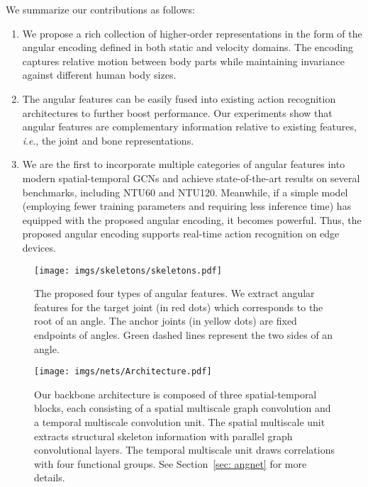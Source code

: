 \documentclass[journal,comsoc]{IEEEtran}
\newcommand{\ie}{\textit{i}.\textit{e}.,}
\begin{document}
We summarize our contributions as follows: 
\begin{enumerate}
    \item We propose a rich collection of higher-order representations in the form of the angular encoding defined in both static and velocity domains. The encoding captures relative motion between body parts while maintaining invariance against different human body sizes. 
    \item The angular features can be easily fused into existing action recognition architectures to further boost performance. Our experiments show that angular features are complementary information relative to existing features, \ie{} the joint and bone representations. 
    \item We are the first to incorporate multiple categories of angular features into modern spatial-temporal GCNs and achieve state-of-the-art results on several benchmarks, including NTU60 and NTU120. Meanwhile, if a simple model (employing fewer training parameters and requiring less inference time) has equipped with the proposed angular encoding, it becomes powerful. Thus, the proposed angular encoding supports real-time action recognition on edge devices. 
\end{enumerate}
 \begin{figure*}
    \centering
    \texttt{[image: imgs/skeletons/skeletons.pdf]}
    \caption{The proposed four types of angular features. We extract angular features for the target joint (in red dots) which corresponds to the root of an angle. The anchor joints (in yellow dots) are fixed endpoints of angles. Green dashed lines represent the two sides of an angle.}
    \label{fig:skeletons}
\end{figure*} \begin{figure*}[ht]
    \centering
    \texttt{[image: imgs/nets/Architecture.pdf]}
    \caption{
    Our backbone architecture is composed of three spatial-temporal blocks, each consisting of a spatial multiscale graph convolution and a temporal multiscale convolution unit. The spatial multiscale unit extracts structural skeleton information with parallel graph convolutional layers. The temporal multiscale unit draws correlations with four functional groups. See Section~\ref{sec: angnet} for more details. 
    }
    \label{fig:net_architecture}
\end{figure*} 
\end{document}

